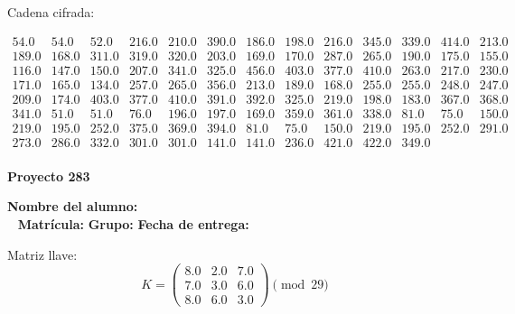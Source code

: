 \documentclass[12pt]{article}
\begin{document}
Cadena cifrada:
\begin{center}
$\begin{array}{lllllllllllll}
54.0 & 54.0 & 52.0 & 216.0 & 210.0 & 390.0 & 186.0 & 198.0 & 216.0 & 345.0 & 339.0 & 414.0 & 213.0\\
189.0 & 168.0 & 311.0 & 319.0 & 320.0 & 203.0 & 169.0 & 170.0 & 287.0 & 265.0 & 190.0 & 175.0 & 155.0\\
116.0 & 147.0 & 150.0 & 207.0 & 341.0 & 325.0 & 456.0 & 403.0 & 377.0 & 410.0 & 263.0 & 217.0 & 230.0\\
171.0 & 165.0 & 134.0 & 257.0 & 265.0 & 356.0 & 213.0 & 189.0 & 168.0 & 255.0 & 255.0 & 248.0 & 247.0\\
209.0 & 174.0 & 403.0 & 377.0 & 410.0 & 391.0 & 392.0 & 325.0 & 219.0 & 198.0 & 183.0 & 367.0 & 368.0\\
341.0 & 51.0 & 51.0 & 76.0 & 196.0 & 197.0 & 169.0 & 359.0 & 361.0 & 338.0 & 81.0 & 75.0 & 150.0\\
219.0 & 195.0 & 252.0 & 375.0 & 369.0 & 394.0 & 81.0 & 75.0 & 150.0 & 219.0 & 195.0 & 252.0 & 291.0\\
273.0 & 286.0 & 332.0 & 301.0 & 301.0 & 141.0 & 141.0 & 236.0 & 421.0 & 422.0 & 349.0\\
\end{array}$
\end{center}

\newpage


\textbf{Proyecto 283}

\textbf{Nombre del alumno:} \underline{\hspace{13cm}}\\\
\vspace{1cm}
\textbf{Matrícula:} \underline{\hspace{4cm}} \hspace{1cm}
\textbf{Grupo:} \underline{\hspace{2cm}}
\textbf{Fecha de entrega:} \underline{\hspace{2cm}}

\medskip

Matriz llave:
\[
K = \begin{pmatrix}
8.0 & 2.0 & 7.0\\
7.0 & 3.0 & 6.0\\
8.0 & 6.0 & 3.0
\end{pmatrix} \pmod{29}
\]
\end{document}
